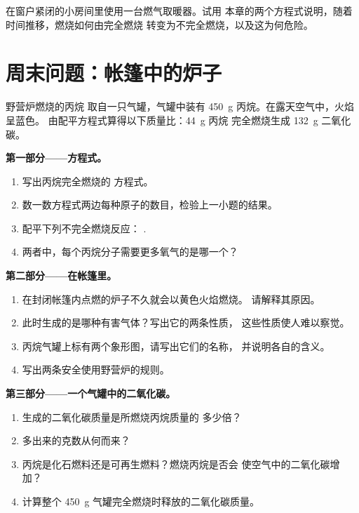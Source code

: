 \begin{exercise}[$\star\star\star$]\label{exo:g8:combustion-and-fuels:12}
在窗户紧闭的小房间里使用一台燃气取暖器。试用
本章的两个方程式说明，随着时间推移，燃烧如何由完全燃烧
转变为不完全燃烧，以及这为何危险。
\end{exercise}

\section{周末问题：帐篷中的炉子}

\begin{problem}
\label{pb:g8:combustion-and-fuels:1}
野营炉燃烧的丙烷  取自一只气罐，气罐中装有
\qty{450}{g} 丙烷。在露天空气中，火焰呈蓝色。
由配平方程式算得以下质量比：\qty{44}{g} 丙烷
完全燃烧生成 \qty{132}{g} 二氧化碳。

\medskip
\noindent\textbf{第一部分——方程式。}
\begin{enumerate}
  \item 写出丙烷完全燃烧的
        方程式。
  \item 数一数方程式两边每种原子的数目，检验上一小题的结果。
  \item 配平下列不完全燃烧反应：
        . %
  \item 两者中，每个丙烷分子需要更多氧气的是哪一个？
\end{enumerate}

\medskip
\noindent\textbf{第二部分——在帐篷里。}
\begin{enumerate}[resume]
  \item 在封闭帐篷内点燃的炉子不久就会以黄色火焰燃烧。
        请解释其原因。
  \item 此时生成的是哪种有害气体？写出它的两条性质，
        这些性质使人难以察觉。
  \item 丙烷气罐上标有两个象形图，请写出它们的名称，
        并说明各自的含义。
  \item 写出两条安全使用野营炉的规则。
\end{enumerate}

\medskip
\noindent\textbf{第三部分——一个气罐中的二氧化碳。}
\begin{enumerate}[resume]
  \item 生成的二氧化碳质量是所燃烧丙烷质量的
        多少倍？
  \item 多出来的克数从何而来？
  \item 丙烷是化石燃料还是可再生燃料？燃烧丙烷是否会
        使空气中的二氧化碳增加？
  \item 计算整个
        \qty{450}{g} 气罐完全燃烧时释放的二氧化碳质量。
\end{enumerate}
\end{problem}
